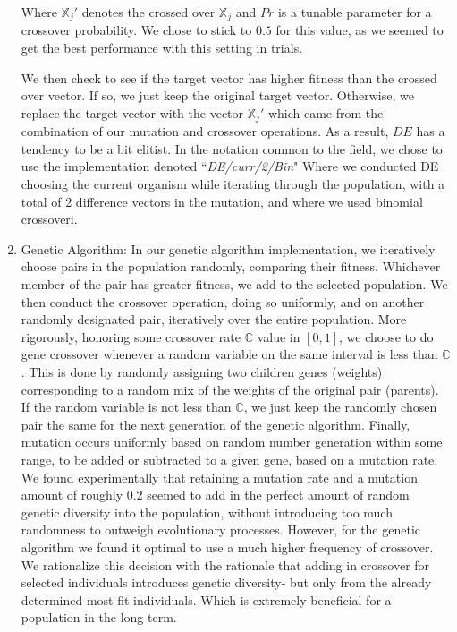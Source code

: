 \documentclass[twoside,11pt]{article}
\begin{document}
\begin{enumerate}
		Where $\mathbb{X}_j'$ denotes the crossed over $\mathbb{X}_j$ and $Pr$ is a tunable parameter for a crossover probability. We chose to stick to $0.5$ for this
		value, as we seemed to get the best performance with this setting in trials.

		We then check to see if the target vector has higher fitness than the crossed over vector. If so, we just keep the original target vector. Otherwise, we replace
		the target vector with the vector $\mathbb{X}_j'$ which came from the combination of our mutation and crossover operations. As a result, $DE$ has a tendency to
		be a bit elitist. In the notation common to the field, we chose to use the implementation denoted ``\textit{DE/curr/2/Bin}" Where we conducted DE choosing the 
		current organism while iterating through the population, with a total of 2 difference vectors in the mutation, and where we used binomial crossoveri.

\item Genetic Algorithm:
	In our genetic algorithm implementation, we iteratively choose pairs in the population randomly, comparing their fitness. Whichever member of the pair has greater
		fitness, we add to the selected population. We then conduct the crossover operation, doing so uniformly, and on another randomly designated pair, iteratively
		over the entire population. More rigorously, honoring some crossover rate $\mathbb{C}$ 
		value in $[0,1]$, we choose to do gene crossover whenever a random variable on the same interval is less than $\mathbb{C}$. This is done by randomly assigning
		two children genes (weights) corresponding to a random mix of the weights of the original pair (parents). If the random variable is not less than $\mathbb{C}$,
		we just keep the randomly chosen pair the same for the next generation of the genetic algorithm. Finally, mutation occurs uniformly based on random number generation
		within some range, to be added or subtracted to a given gene, based on a mutation rate. We found experimentally that retaining a mutation rate and a mutation amount
		of roughly $0.2$ seemed to add in the perfect amount of random genetic diversity into the population, without introducing too much randomness to outweigh
		evolutionary processes. However, for the genetic algorithm we found it optimal to use a much higher frequency of crossover. We rationalize this decision with the
		rationale that adding in crossover for selected individuals introduces genetic diversity- but only from the already determined most fit individuals. Which is extremely
		beneficial for a population in the long term.


\end{enumerate}
\end{document}
